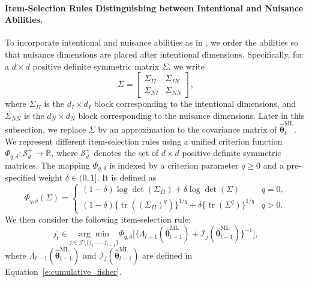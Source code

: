 \documentclass[12pt]{article}
\newcommand{\bftheta}{\boldsymbol{\theta}}
\begin{document}
\paragraph{Item-Selection Rules Distinguishing between Intentional and Nuisance Abilities.}
To incorporate intentional and nuisance abilities as in , we order the abilities so that nuisance dimensions are placed after intentional dimensions. Specifically, for a $d \times d$ positive definite symmetric matrix $\Sigma$, we write
\begin{equation} \label{e:decomp}
\Sigma =
\begin{bmatrix}
 \Sigma_{II} & \Sigma_{IN}
 \\ \Sigma_{NI} & \Sigma_{NN}
\end{bmatrix},
\end{equation}
where $\Sigma_{II}$ is the $d_I \times d_I$ block corresponding to the intentional dimensions, and $\Sigma_{NN}$ is the $d_N \times d_N$ block corresponding to the nuisance dimensions. Later in this subsection, we replace $\Sigma$ by an approximation to the covariance matrix of $\hat{\bftheta}^{\text{ML}}_{t}$.
We represent different item-selection rules using a unified criterion function $\Phi_{q,\delta}: \mathcal{S}_d^{+} \to \mathbb{R}$, where $\mathcal{S}_d^{+}$ denotes the set of $d \times d$ positive definite symmetric matrices. 
The mapping $\Phi_{q,\delta}$ is indexed by a criterion parameter $q \ge 0$ and a pre-specified weight $\delta \in (0,1]$. It is defined as
\begin{equation} \label{e:selection}
\Phi_{q,\delta}(\Sigma) =
\begin{cases}
  (1 - \delta) \log \operatorname{det}( \Sigma_{II} ) + \delta \log \operatorname{det}( \Sigma ) & q = 0,
  \\ (1 - \delta) \{ \operatorname{tr}( (\Sigma_{II})^{q} )\}^{1/q} + \delta \{ \operatorname{tr}(\Sigma^q) \}^{1/q}  & q > 0.
\end{cases}
\end{equation}
We then consider the following item-selection rule:
\begin{equation} \label{e:phi-q-delta-optimal}
  j_t \in \underset{j \in \mathcal{J} \setminus \{j_1, \ldots, j_{t-1}\}}{\arg \min} \Phi_{q, \delta} \Big[ \Big\{ \Lambda_{t-1}( \hat{\bftheta}_{t-1}^{\mathrm{ML}}) + \mathcal{I}_j(\hat{\bftheta}_{t-1}^{\mathrm{ML}}) \Big\}^{-1} \Big],
\end{equation}
where $\Lambda_{t-1}( \hat{\bftheta}_{t-1}^{\mathrm{ML}} )$ and $\mathcal{I}_j(\hat{\boldsymbol{\theta}}_{t-1}^{\mathrm{ML}})$ are defined in Equation~\eqref{e:cumulative_fisher}. 
\end{document}
